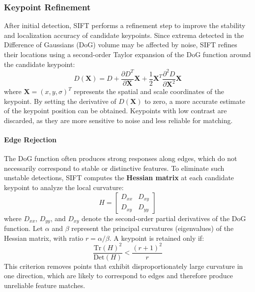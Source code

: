 \subsubsection{Keypoint Refinement}
After initial detection, SIFT performs a refinement step to improve the stability and localization accuracy of candidate keypoints.
Since extrema detected in the Difference of Gaussians (DoG) volume may be affected by noise, 
SIFT refines their locations using a second-order Taylor expansion of the DoG function around the candidate keypoint:
\begin{equation}
    D(\mathbf{X}) = D + \frac{\partial D^T}{\partial \mathbf{X}}\mathbf{X}
    + \frac{1}{2}\mathbf{X}^T
    \frac{\partial^2 D}{\partial \mathbf{X}^2}\mathbf{X}
\end{equation}
where $\mathbf{X} = (x, y, \sigma)^T$ represents the spatial and scale coordinates of the keypoint.
By setting the derivative of $D(\mathbf{X})$ to zero, a more accurate estimate of the keypoint position can be obtained.
Keypoints with low contrast are discarded, as they are more sensitive to noise and less reliable for matching.

\paragraph{Edge Rejection}
The DoG function often produces strong responses along edges, which do not necessarily correspond to stable or distinctive features.
To eliminate such unstable detections, SIFT computes the \textbf{Hessian matrix} at each candidate keypoint to analyze the local curvature:
\begin{equation}
    H =
    \begin{bmatrix}
    D_{xx} & D_{xy} \\
    D_{xy} & D_{yy}
    \end{bmatrix}
\end{equation}
where $D_{xx}$, $D_{yy}$, and $D_{xy}$ denote the second-order partial derivatives of the DoG function.
Let $\alpha$ and $\beta$ represent the principal curvatures (eigenvalues) of the Hessian matrix, with ratio $r=\alpha/\beta$.
A keypoint is retained only if:
\[
    \frac{\mathrm{Tr}(H)^2}{\mathrm{Det}(H)} < \frac{(r+1)^2}{r}
\]
This criterion removes points that exhibit disproportionately large curvature in one direction, 
which are likely to correspond to edges and therefore produce unreliable feature matches.

